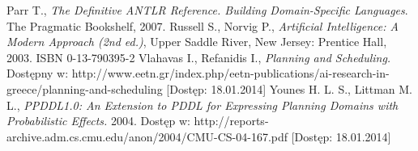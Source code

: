 \begin{thebibliography}{1}
Parr T., \emph{The Definitive ANTLR Reference. Building Domain-Specific Languages}. 
The Pragmatic Bookshelf, 2007.
 Russell S., Norvig P., \emph{Artificial Intelligence: A
Modern Approach (2nd ed.)}, Upper Saddle River, New Jersey: Prentice Hall, 2003.
ISBN 0-13-790395-2
 Vlahavas I., Refanidis I., \emph{Planning and Scheduling.} Dostępny w: http://www.eetn.gr/index.php/eetn-publications/ai-research-in-greece/planning-and-scheduling [Dostęp: 18.01.2014]
 Younes H. L. S., Littman M. L., \emph{PPDDL1.0: An Extension to PDDL for Expressing
Planning Domains with Probabilistic Effects.} 2004. Dostęp w: http://reports-archive.adm.cs.cmu.edu/anon/2004/CMU-CS-04-167.pdf [Dostęp: 18.01.2014]










\end{thebibliography}
